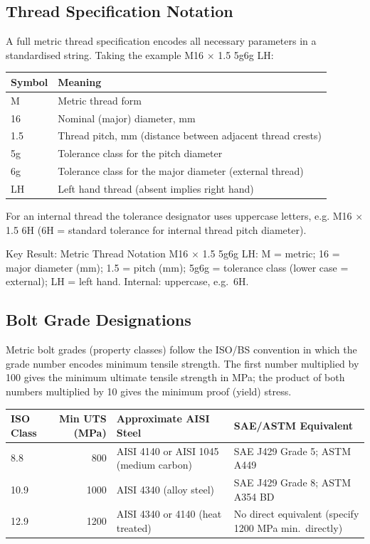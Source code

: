 \documentclass[10pt,a4paper]{article}
\begin{document}
\subsection{Thread Specification Notation}

A full metric thread specification encodes all necessary parameters in a standardised string. Taking the example M16 $\times$ 1.5 5g6g LH:

\begin{center}\small
\begin{tabular}{@{}ll@{}}
\toprule
Symbol & Meaning \\
\midrule
M & Metric thread form \\
16 & Nominal (major) diameter, mm \\
1.5 & Thread pitch, mm (distance between adjacent thread crests) \\
5g & Tolerance class for the pitch diameter \\
6g & Tolerance class for the major diameter (external thread) \\
LH & Left hand thread (absent implies right hand) \\
\bottomrule
\end{tabular}
\end{center}

For an internal thread the tolerance designator uses uppercase letters, e.g. M16 $\times$ 1.5 6H (6H = standard tolerance for internal thread pitch diameter).

\begin{keybox}{Key Result: Metric Thread Notation}
M16 $\times$ 1.5 5g6g LH: M = metric; 16 = major diameter (mm); 1.5 = pitch (mm); 5g6g = tolerance class (lower case = external); LH = left hand. Internal: uppercase, e.g.\ 6H.
\end{keybox}

\subsection{Bolt Grade Designations}

Metric bolt grades (property classes) follow the ISO/BS convention in which the grade number encodes minimum tensile strength. The first number multiplied by 100 gives the minimum ultimate tensile strength in MPa; the product of both numbers multiplied by 10 gives the minimum proof (yield) stress.

\begin{center}\small
\begin{tabular}{@{}lrll@{}}
\toprule
ISO Class & Min UTS (MPa) & Approximate AISI Steel & SAE/ASTM Equivalent \\
\midrule
8.8 & 800 & AISI 4140 or AISI 1045 (medium carbon) & SAE J429 Grade 5; ASTM A449 \\
10.9 & 1000 & AISI 4340 (alloy steel) & SAE J429 Grade 8; ASTM A354 BD \\
12.9 & 1200 & AISI 4340 or 4140 (heat treated) & No direct equivalent (specify 1200 MPa min.\ directly) \\
\bottomrule
\end{tabular}
\end{center}
\end{document}
